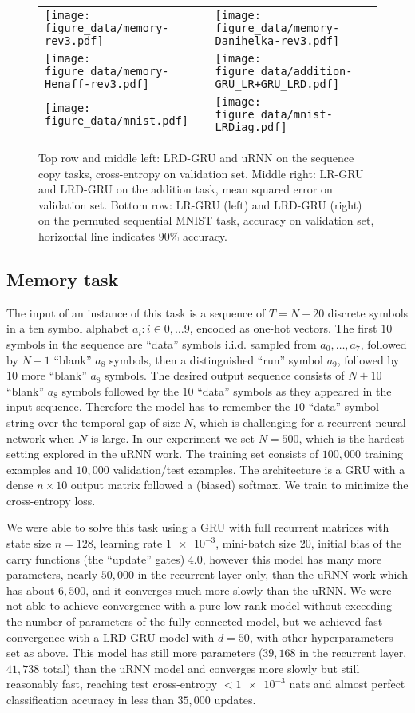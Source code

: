 \documentclass[11pt,a4paper]{article}
\begin{document}
\begin{figure*}
\setlength\tabcolsep{0.0pt}
\begin{tabular}{ll}
\texttt{[image: figure\_data/memory-rev3.pdf]}
&
\texttt{[image: figure\_data/memory-Danihelka-rev3.pdf]} 
\\
\texttt{[image: figure\_data/memory-Henaff-rev3.pdf]} 
&
\texttt{[image: figure\_data/addition-GRU\_LR+GRU\_LRD.pdf]} 
\\
\texttt{[image: figure\_data/mnist.pdf]} 
&
\texttt{[image: figure\_data/mnist-LRDiag.pdf]} 
\end{tabular}
\caption{Top row and middle left: LRD-GRU and uRNN on the sequence copy tasks, cross-entropy on validation set. Middle right: LR-GRU and LRD-GRU on the addition task, mean squared error on validation set. Bottom row: LR-GRU (left) and LRD-GRU (right) on the permuted sequential MNIST task, accuracy on validation set, horizontal line indicates 90\% accuracy.}
\label{FIG:LRDGRU}
\end{figure*}

\subsection{Memory task}
The input of an instance of this task is a sequence of $T=N+20$ discrete symbols in a ten symbol alphabet ${a_i : i \in 0, \dots 9}$, encoded as one-hot vectors. The first $10$ symbols in the sequence are ``data'' symbols i.i.d. sampled from $a_0, \dots, a_7$, followed by $N-1$ ``blank'' $a_8$ symbols, then a distinguished ``run'' symbol $a_9$, followed by $10$ more ``blank'' $a_8$ symbols. The desired output sequence consists of $N+10$ ``blank'' $a_8$ symbols followed by the $10$ ``data'' symbols as they appeared in the input sequence. Therefore the model has to remember the $10$ ``data'' symbol string over the temporal gap of size $N$, which is challenging for a recurrent neural network when $N$ is large. In our experiment we set $N=500$, which is the hardest setting explored in the uRNN work. The training set consists of $100,000$ training examples and $10,000$ validation/test examples. The architecture is a GRU with a dense $n \times 10$ output matrix followed a (biased) softmax. We train to minimize the cross-entropy loss. 

We were able to solve this task using a GRU with full recurrent matrices with state size $n=128$, learning rate $\num{1e-3}$, mini-batch size $20$, initial bias of the carry functions (the ``update'' gates) $4.0$, however this model has many more parameters, nearly $50,000$ in the recurrent layer only, than the uRNN work which has about $6,500$, and it converges much more slowly than the uRNN. We were not able to achieve convergence with a pure low-rank model without exceeding the number of parameters of the fully connected model, but we achieved fast convergence with a LRD-GRU model with $d=50$, with other hyperparameters set as above. This model has still more parameters ($39,168$ in the recurrent layer, $41,738$ total) than the uRNN model and converges more slowly but still reasonably fast, reaching test cross-entropy $< \num{1e-3}$ nats and almost perfect classification accuracy in less than $35,000$ updates.
\end{document}
